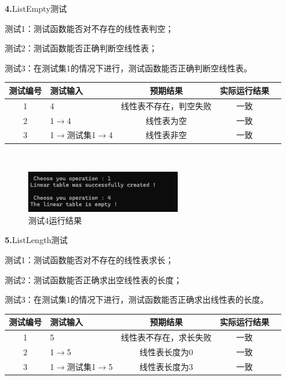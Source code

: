 \documentclass[supercite]{Experimental_Report}
\theoremstyle{definition}
\begin{document}
\noindent\textbf{ 4.}ListEmpty测试

测试1：测试函数能否对不存在的线性表判空；

测试2：测试函数能否正确判断空线性表；

测试3：在测试集1的情况下进行，测试函数能否正确判断空线性表。

\vspace{0.5em}

\begin{tabular}{|c|l|c|c|c|}
	\hline
	测试编号 & 测试输入 & 预期结果 & 实际运行结果 \\
	\hline
	1 & 4 & 线性表不存在，判空失败 & 一致 \\
	\hline
	2 & 1$\rightarrow$4 & 线性表为空 & 一致 \\
	\hline
	3 & 1$\rightarrow$测试集1$\rightarrow$4 & 线性表非空 & 一致 \\
	\hline
\end{tabular}

~\

 \begin{figure}[H]
 	\centering
 	\includegraphics[width=0.6\textwidth]{images/线性表测试4.png}
 	\caption{测试4运行结果}
 	\label{txlab}
 \end{figure}


\noindent\textbf{ 5.}ListLength测试


测试1：测试函数能否对不存在的线性表求长；

测试2：测试函数能否正确求出空线性表的长度；

测试3：在测试集1的情况下进行，测试函数能否正确求出线性表的长度。

\vspace{0.5em}

\begin{tabular}{|c|l|c|c|c|}
	\hline
	测试编号 & 测试输入 & 预期结果 & 实际运行结果 \\
	\hline
	1 & 5 & 线性表不存在，求长失败 & 一致 \\
	\hline
	2 & 1$\rightarrow$5 & 线性表长度为0 & 一致 \\
	\hline
	3 & 1$\rightarrow$测试集1$\rightarrow$5 & 线性表长度为3 & 一致 \\
	\hline
\end{tabular}

~\
\end{document}

